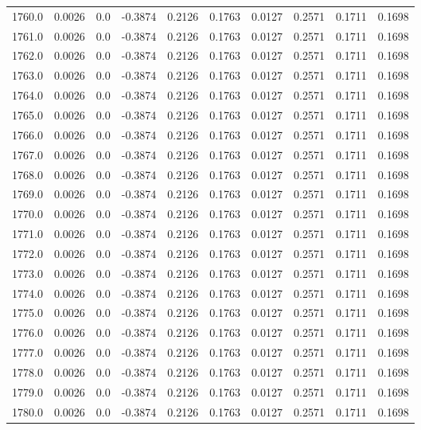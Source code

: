 \begin{longtable}{lrrrrrrrrr}
1760.0 & 0.0026 & 0.0 & -0.3874 & 0.2126 & 0.1763 & 0.0127 & 0.2571 & 0.1711 & 0.1698 \\
1761.0 & 0.0026 & 0.0 & -0.3874 & 0.2126 & 0.1763 & 0.0127 & 0.2571 & 0.1711 & 0.1698 \\
1762.0 & 0.0026 & 0.0 & -0.3874 & 0.2126 & 0.1763 & 0.0127 & 0.2571 & 0.1711 & 0.1698 \\
1763.0 & 0.0026 & 0.0 & -0.3874 & 0.2126 & 0.1763 & 0.0127 & 0.2571 & 0.1711 & 0.1698 \\
1764.0 & 0.0026 & 0.0 & -0.3874 & 0.2126 & 0.1763 & 0.0127 & 0.2571 & 0.1711 & 0.1698 \\
1765.0 & 0.0026 & 0.0 & -0.3874 & 0.2126 & 0.1763 & 0.0127 & 0.2571 & 0.1711 & 0.1698 \\
1766.0 & 0.0026 & 0.0 & -0.3874 & 0.2126 & 0.1763 & 0.0127 & 0.2571 & 0.1711 & 0.1698 \\
1767.0 & 0.0026 & 0.0 & -0.3874 & 0.2126 & 0.1763 & 0.0127 & 0.2571 & 0.1711 & 0.1698 \\
1768.0 & 0.0026 & 0.0 & -0.3874 & 0.2126 & 0.1763 & 0.0127 & 0.2571 & 0.1711 & 0.1698 \\
1769.0 & 0.0026 & 0.0 & -0.3874 & 0.2126 & 0.1763 & 0.0127 & 0.2571 & 0.1711 & 0.1698 \\
1770.0 & 0.0026 & 0.0 & -0.3874 & 0.2126 & 0.1763 & 0.0127 & 0.2571 & 0.1711 & 0.1698 \\
1771.0 & 0.0026 & 0.0 & -0.3874 & 0.2126 & 0.1763 & 0.0127 & 0.2571 & 0.1711 & 0.1698 \\
1772.0 & 0.0026 & 0.0 & -0.3874 & 0.2126 & 0.1763 & 0.0127 & 0.2571 & 0.1711 & 0.1698 \\
1773.0 & 0.0026 & 0.0 & -0.3874 & 0.2126 & 0.1763 & 0.0127 & 0.2571 & 0.1711 & 0.1698 \\
1774.0 & 0.0026 & 0.0 & -0.3874 & 0.2126 & 0.1763 & 0.0127 & 0.2571 & 0.1711 & 0.1698 \\
1775.0 & 0.0026 & 0.0 & -0.3874 & 0.2126 & 0.1763 & 0.0127 & 0.2571 & 0.1711 & 0.1698 \\
1776.0 & 0.0026 & 0.0 & -0.3874 & 0.2126 & 0.1763 & 0.0127 & 0.2571 & 0.1711 & 0.1698 \\
1777.0 & 0.0026 & 0.0 & -0.3874 & 0.2126 & 0.1763 & 0.0127 & 0.2571 & 0.1711 & 0.1698 \\
1778.0 & 0.0026 & 0.0 & -0.3874 & 0.2126 & 0.1763 & 0.0127 & 0.2571 & 0.1711 & 0.1698 \\
1779.0 & 0.0026 & 0.0 & -0.3874 & 0.2126 & 0.1763 & 0.0127 & 0.2571 & 0.1711 & 0.1698 \\
1780.0 & 0.0026 & 0.0 & -0.3874 & 0.2126 & 0.1763 & 0.0127 & 0.2571 & 0.1711 & 0.1698 \\

\end{longtable}
